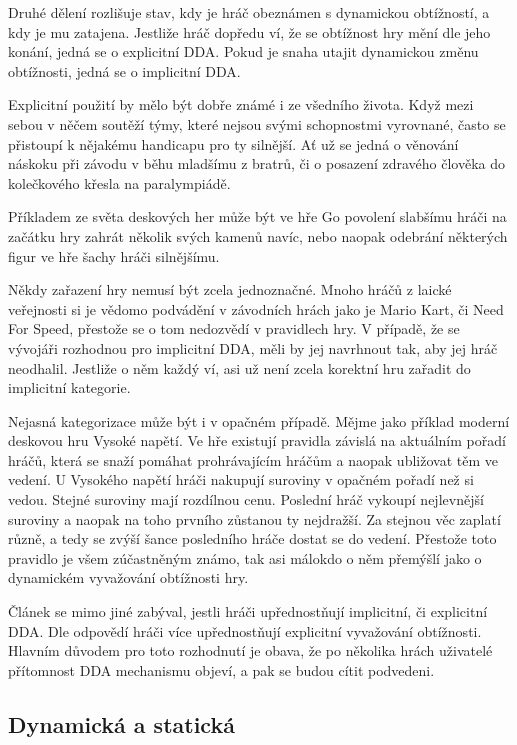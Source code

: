 Druhé dělení rozlišuje stav, kdy je hráč obeznámen s dynamickou obtížností, a kdy je mu zatajena. Jestliže hráč dopředu ví, že se obtížnost hry mění dle jeho konání, jedná se o explicitní DDA. Pokud je snaha utajit dynamickou změnu obtížnosti, jedná se o implicitní DDA.

Explicitní použití by mělo být dobře známé i ze všedního života. Když mezi sebou v něčem soutěží týmy, které nejsou svými schopnostmi vyrovnané, často se přistoupí k nějakému handicapu pro ty silnější. Ať už se jedná o věnování náskoku při závodu v běhu mladšímu z bratrů, či o posazení zdravého člověka do kolečkového křesla na paralympiádě. 

Příkladem ze světa deskových her může být ve hře Go povolení slabšímu hráči na začátku hry zahrát několik svých kamenů navíc, nebo naopak odebrání některých figur ve hře šachy hráči silnějšímu.

Někdy zařazení hry nemusí být zcela jednoznačné. Mnoho hráčů z laické veřejnosti si je vědomo podvádění v závodních hrách jako je Mario Kart\cite{5}, či Need For Speed\cite{1}, přestože se o tom nedozvědí v pravidlech hry. V případě, že se vývojáři rozhodnou pro implicitní DDA, měli by jej navrhnout tak, aby jej hráč neodhalil. Jestliže o něm každý ví, asi už není zcela korektní hru zařadit do implicitní kategorie.

Nejasná kategorizace může být i v opačném případě. Mějme jako příklad moderní deskovou hru Vysoké napětí\cite{powergrid}. Ve hře existují pravidla závislá na aktuálním pořadí hráčů, která se snaží pomáhat prohrávajícím hráčům a naopak ubližovat těm ve vedení. U Vysokého napětí hráči nakupují suroviny v opačném pořadí než si vedou. Stejné suroviny mají rozdílnou cenu. Poslední hráč vykoupí nejlevnější suroviny a naopak na toho prvního zůstanou ty nejdražší. Za stejnou věc zaplatí různě, a tedy se zvýší šance posledního hráče dostat se do vedení. Přestože toto pravidlo je všem zúčastněným známo, tak asi málokdo o něm přemýšlí jako o dynamickém vyvažování obtížnosti hry.

Článek \cite{BoardGames} se mimo jiné zabýval, jestli hráči upřednostňují implicitní, či explicitní DDA. Dle odpovědí hráči více upřednostňují explicitní vyvažování obtížnosti. Hlavním důvodem pro toto rozhodnutí je obava, že po několika hrách uživatelé přítomnost DDA mechanismu objeví, a pak se budou cítit podvedeni.

\subsection{Dynamická a statická}

